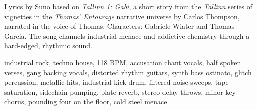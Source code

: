 

\begin{notes}
Lyrics by Suno based on \emph{Tallinn 1: Gabi}, a short story from the \emph{Tallinn} series of vignettes in the \emph{Thomas’ Entourage} narrative universe by Carlos Thompson, narrated in the voice of Thomas. Characters: Gabriele Wiater and Thomas Garcia. %
The song channels industrial menace and addictive chemistry through a hard-edged, rhythmic sound.
\end{notes}

\begin{style}
industrial rock, techno house, 118 BPM, accusation chant vocals, half spoken verses, gang backing vocals, distorted rhythm guitars, synth bass ostinato, glitch percussion, metallic hits, industrial kick drum, filtered noise sweeps, tape saturation, sidechain pumping, plate reverb, stereo delay throws, minor key chorus, pounding four on the floor, cold steel menace
\end{style}

